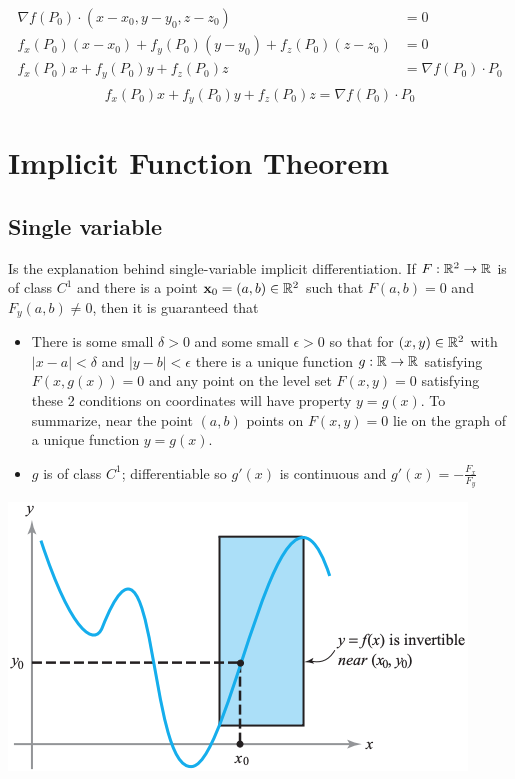 \begin{align*}
    \nabla f (P_0)\cdot(x-x_0, y-y_0,z- z_0)&=0\\
    f_x(P_0)(x-x_0)+f_y(P_0)(y-y_0)+f_z(P_0)(z-z_0)&=0\\
    f_x(P_0)x+f_y(P_0)y+f_z(P_0)z&=\nabla f(P_0)\cdot P_0\\
\end{align*}
$$\boxed{f_x(P_0)x+f_y(P_0)y+f_z(P_0)z=\nabla f(P_0)\cdot P_0}$$

\section{Implicit Function Theorem}

\subsection{Single variable}

Is the explanation behind single-variable implicit differentiation.
If $F:\mathbb{R}^2\to \mathbb{R}$ is of class $C^1$ and there is a point $\textbf{x}_0=(a,b)\in\mathbb{R}^2$ such that 
$F(a,b)=0$ and $F_y(a,b)\neq 0$, then it is guaranteed that
\begin{itemize}
    \item There is some small $\delta>0$ and some small $\epsilon>0$ so that for $(x,y)\in\mathbb{R}^2$ with $|x-a|<\delta$ and $|y-b|<\epsilon$ there is a unique function $g:\mathbb{R}\to\mathbb{R}$ satisfying
    $F(x,g(x))=0$ and any point on the level set $F(x,y)=0$ satisfying these 2 conditions on coordinates will have property $y=g(x)$. To summarize, near the point $(a,b)$ points on $F(x,y)=0$ lie on the graph of a unique function $y=g(x)$.
    \item $g$ is of class $C^1$; differentiable so $g'(x)$ is continuous and $g'(x)=-\frac{F_x}{F_y}$
\end{itemize}

\begin{center}
    \includegraphics[scale=0.4]{figures/Screen Shot 2021-05-10 at 7.08.59 AM.png}
\end{center}

